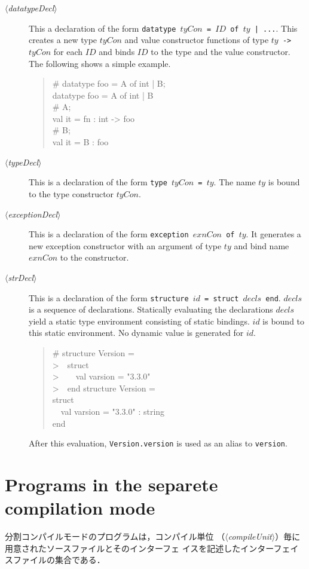 \documentclass{jbook}
\newcommand{\txt}[2]{#2}
\newcommand{\version}{3.3.0}
\newcommand{\code}[1]{\mbox{\large\tt #1}}
\newcommand{\nonterm}[1]{\mbox{$\langle$}{\it #1}\mbox{$\rangle$}}
\newcommand{\myem}{\mbox{\ \ }}
\newenvironment{program}{\begin{quote}\begin{tt}}%
                        {\end{tt}\end{quote}}
\begin{document}
\begin{description}
\item[\nonterm{datatypeDecl}] 
	This a declaration of the form \code{datatype $tyCon$ = $ID$ of
$ty$ | ...}.
	This creates a new type $tyCon$ and value constructor functions 
of type \code{$ty$ -> $tyCon$} for each $ID$ and binds $ID$ to the type
and the value constructor. 
	The following shows a simple example.
\begin{program}
  \# datatype foo = A of int | B;\\
  datatype foo = A of int | B\\
  \# A;\\
  val it = fn : int -> foo\\
  \# B;\\
  val it = B : foo
\end{program}

\item[\nonterm{typeDecl}] 
	This is a declaration of the form \code{type $tyCon$ = $ty$}.
	The name $ty$ is bound to the type constructor $tyCon$.

\item[\nonterm{exceptionDecl}] 
	This is a declaration of the form \code{exception $exnCon$ of $ty$}.
	It generates a new exception constructor with an argument of
type $ty$ and bind name $exnCon$ to the constructor.

\item[\nonterm{strDecl}] 
	This is a declaration of the form \code{structure $id$ = struct $decls$ end}.
	$decls$ is a sequence of declarations.
	Statically evaluating the declarations $decls$
yield a static type environment consisting of static bindings.
	$id$ is bound to this static environment.
	No dynamic value is generated for $id$.
\begin{program}
  \# structure Version =\\
  >\myem struct\\
  >\myem\myem val varsion = "\version"\\
  >\myem end
  structure Version =\\
    struct\\
    \myem  val varsion = "\version" : string\\
    end
\end{program}
	After this evaluation, \code{Version.version} is used 
as an alias to \code{version}.
\end{description}
\fi%

\section{\txt{分割コンパイルモードのプログラム}{Programs in the separete compilation mode}}
\ifjp%
	分割コンパイルモードのプログラムは，コンパイル単位
（\nonterm{compileUnit}）毎に用意されたソースファイルとそのインターフェ
イスを記述したインターフェイスファイルの集合である．
\end{document}
